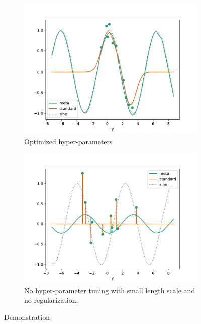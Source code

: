 \documentclass{tran-l}
\theoremstyle{definition}
\theoremstyle{remark}
\numberwithin{equation}{section}
\begin{document}
\begin{figure}
  \centering
  \begin{subfigure}[b]{0.45\textwidth}
    \centering
    \includegraphics[width=\textwidth]{Figures/noise_1}
    \caption{Optimized hyper-parameters}
   \end{subfigure}
   \hfill
   \begin{subfigure}[b]{0.45\textwidth}
     \centering
     \includegraphics[width=\textwidth]{Figures/no_opt}
    \caption{No hyper-parameter tuning with small length scale and no regularization.}
   \end{subfigure}
    \caption{Demonstration}
\end{figure}
\end{document}
